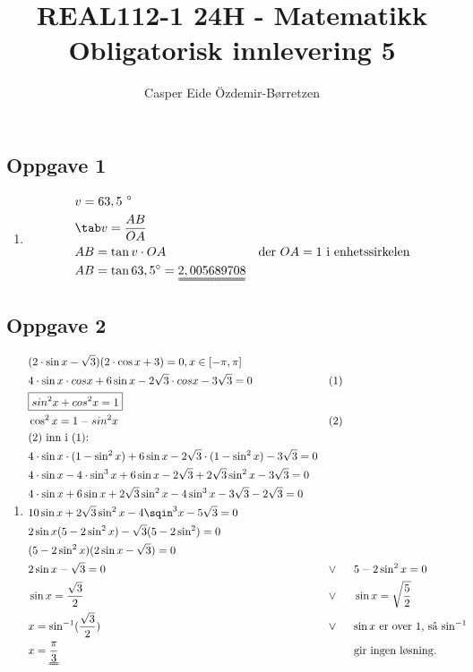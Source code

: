 \documentclass[11pt,a4paper]{report}
\title{REAL112-1 24H - Matematikk\\Obligatorisk innlevering 5}
\author{Casper Eide Özdemir-Børretzen}
\date{}
\newcommand{\opgd}[1]{\item[#1)]}
\newcommand{\opg}[1]{\subsection*{Oppgave #1}}
\begin{document}



\opg{1}
\begin{enumerate}[leftmargin=*,itemsep=0.75cm,labelsep=1.5em,label=\alph*)]
\opgd{a}
\begin{align*}
&v = 63,5\ \degree\\
&\tab v = \frac{AB}{OA}\\
&AB = \tan v \cdot OA &\text{der $OA = 1$ i enhetssirkelen}\\
&AB = \tan 63,5 \degree = \uuline{2,005689708}
\end{align*}
\end{enumerate}


\opg{2}
\begin{enumerate}[leftmargin=*,itemsep=0.75cm,labelsep=1.5em,label=\alph*)]
\opgd{a}
\begin{align*}
&(2 \cdot \sin x - \sqrt{3}) (2 \cdot \cos x + 3) = 0, x \in [-\pi, \pi]\\
&4 \cdot \sin x \cdot cos x + 6 \sin x - 2 \sqrt{3} \cdot cos x - 3 \sqrt{3} = 0 &&(1)\\
&\boxed{sin^2 x + cos^2 x = 1} \\
&\cos^2 x = 1 - sin^2 x &&(2)\\
&\text{$(2)$ inn i $(1)$:}\\
&4 \cdot \sin x \cdot (1 - \sin^2 x) + 6 \sin x - 2 \sqrt{3} \cdot (1 - \sin^2 x) - 3 \sqrt{3} = 0\\
&4 \cdot \sin x - 4 \cdot \sin^3 x + 6 \sin x - 2 \sqrt{3} + 2 \sqrt{3} \sin^2 x - 3 \sqrt{3} = 0\\
&4 \cdot \sin x + 6 \sin x + 2 \sqrt{3} \sin^2 x - 4 \sin^3 x - 3 \sqrt{3} - 2 \sqrt{3} = 0\\
&10 \sin x + 2 \sqrt{3} \sin^2 x - 4 \sqin^3 x - 5 \sqrt{3} = 0\\
&2 \sin x (5 - 2 \sin^2 x) - \sqrt{3} (5 - 2 \sin^2) = 0\\
&(5 - 2 \sin^2 x) (2 \sin x - \sqrt{3}) = 0\\
&2 \sin x - \sqrt{3} = 0    &&\lor &&5 - 2 \sin^2 x = 0\\
&\sin x = \frac{\sqrt{3}}{2} &&\lor &&\sin x = \sqrt{\frac{5}{2}}\\
&x = \sin^{-1}(\frac{\sqrt{3}}{2}) &&\lor &&\text{$\sin x$ er over $1$, så $\sin^{-1}$}\\
&x = \uuline{\frac{\pi}{3}} && &&\text{gir ingen løsning.}
\end{align*}
\end{enumerate}
\end{document}
